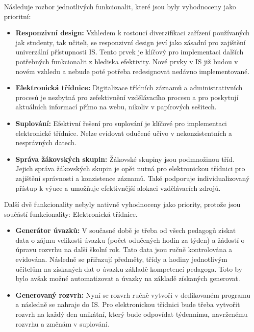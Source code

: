 \documentclass[FM,Proj]{tulthesis}
\begin{document}
Následuje rozbor jednotlivých funkcionalit, které jsou byly vyhodnoceny jako prioritní:
\begin{itemize}
    \item \textbf{Responzivní design:} Vzhledem k rostoucí diverzifikaci zařízení používaných
    jak studenty, tak učiteli, se responzivní design jeví jako zásadní pro zajištění univerzální
    přístupnosti IS. Tento prvek je klíčový pro implementaci dalších potřebných funkcionalit z
    hlediska efektivity. Nové prvky v IS již budou v novém vzhledu a nebude poté potřeba 
    redesignovat nedávno implementované.

    \item \textbf{Elektronická třídnice:} Digitalizace třídních záznamů a administrativních 
    procesů je nezbytná pro zefektivnění vzdělávacího procesu a pro poskytují aktuálních informací
    přímo na webu, nikoliv v papírových sešitech.

    \item \textbf{Suplování:} Efektivní řešení pro suplování je klíčové pro implementaci 
    elektronické třídnice. Nelze evidovat odučené učivo v nekonzistentních a nesprávných datech.

    \item \textbf{Správa žákovských skupin:} Žákovské skupiny jsou podmnožinou tříd. Jejich 
    správa žákovských skupin je opět nutná pro elektronickou třídnici pro zajištění správnosti
    a konzistence záznamů. Také podporuje individualizovaný přístup k výuce a umožňuje 
    efektivnější alokaci vzdělávacích zdrojů.
\end{itemize}

Další dvě funkcionality nebyly nativně vyhodnoceny jako priority, protože jsou součástí 
funkcionality: Elektronická třídnice.
\begin{itemize}
    \item \textbf{Generátor úvazků:} V současné době je třeba od všech pedagogů získat data
    o zájmu velikosti úvazku (počet odučených hodin za týden) a žádostí o úpravu rozvrhu na 
    další školní rok. Tato data jsou ručně kontrolována a evidována. Následně se přiřazují 
    předměty, třídy a hodiny jednotlivým učitelům na získaných dat o úvazku základě kompetencí
    pedagoga. Toto by bylo avšak možné automatizovat a úvazky na základě získaných generovat.

    \item \textbf{Generovaný rozvrh:} Nyní se rozvrh ručně vytvoří v dedikovaném programu a 
    následně se nahraje do IS. Pro elektronickou třídnici bude třeba vytvořit rozvrh na každý 
    den unikátní, který bude odpovídat týdennímu, navrženému rozvrhu a změnám v suplování.
\end{itemize}
\end{document}

